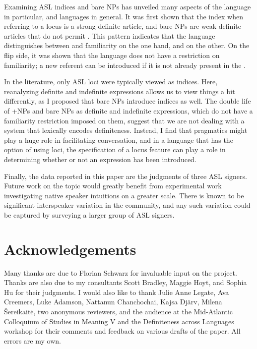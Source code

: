 \documentclass[output=paper,
modfonts
]{langscibook}
\begin{document}
Examining ASL indices and bare NPs has unveiled many aspects of the language in particular, and languages in general. It was first shown that the index  when referring to a locus is a strong definite article, and bare NPs are weak definite articles that do not permit . This pattern indicates that the language distinguishes between  and familiarity on the one hand, and  on the other. On the flip side, it was shown that the language does not have a restriction on familiarity; a new referent can be introduced if it is not already present in the .  

In the literature, only ASL loci were typically viewed as indices. Here, reanalyzing definite and indefinite expressions allows us to view things a bit differently, as I proposed that bare NPs introduce indices as well. The double life of +NPs and bare NPs as definite and indefinite expressions, which do not have a familiarity restriction imposed on them, suggest that we are not dealing with a system that lexically encodes definiteness. Instead, I find that pragmatics might play a huge role in facilitating conversation, and in a language that has the option of using loci, the specification of a locus feature can play a role in determining whether or not an expression has been introduced.

Finally, the data reported in this paper are the judgments of three ASL signers. Future work on the topic would greatly benefit from experimental work investigating native speaker intuitions on a greater scale. There is known to be significant interspeaker variation in the community, and any such variation could be captured by surveying a larger group of ASL signers. 

\section*{Acknowledgements}

Many thanks are due to Florian Schwarz for invaluable input on the project. Thanks are also due to my consultants Scott Bradley, Maggie Hoyt, and Sophia Hu for their judgments. I would also like to thank Julie Anne Legate, Ava Creemers, Luke Adamson, Nattanun Chanchochai, Kajsa Dj{\"a}rv, Milena \v{S}ereikait\.{e}, two anonymous reviewers, and the audience at the Mid-Atlantic Colloquium of Studies in Meaning V and the Definiteness across Languages workshop for their comments and feedback on various drafts of the paper. All errors are my own.

{\sloppy
\printbibliography[heading=subbibliography,notkeyword=this]
}
\end{document}
